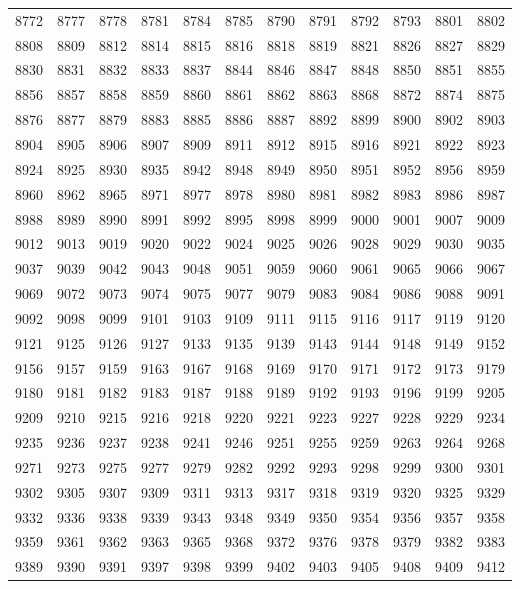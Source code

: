 \begin{center}
\begin{longtable}{llllllllllll}
8772 &8777 &8778 &8781 &8784 &8785 &8790 &8791 &8792 &8793 &8801 &8802 \\
8808 &8809 &8812 &8814 &8815 &8816 &8818 &8819 &8821 &8826 &8827 &8829 \\
8830 &8831 &8832 &8833 &8837 &8844 &8846 &8847 &8848 &8850 &8851 &8855 \\
8856 &8857 &8858 &8859 &8860 &8861 &8862 &8863 &8868 &8872 &8874 &8875 \\
8876 &8877 &8879 &8883 &8885 &8886 &8887 &8892 &8899 &8900 &8902 &8903 \\
8904 &8905 &8906 &8907 &8909 &8911 &8912 &8915 &8916 &8921 &8922 &8923 \\
8924 &8925 &8930 &8935 &8942 &8948 &8949 &8950 &8951 &8952 &8956 &8959 \\
8960 &8962 &8965 &8971 &8977 &8978 &8980 &8981 &8982 &8983 &8986 &8987 \\
8988 &8989 &8990 &8991 &8992 &8995 &8998 &8999 &9000 &9001 &9007 &9009 \\
9012 &9013 &9019 &9020 &9022 &9024 &9025 &9026 &9028 &9029 &9030 &9035 \\
9037 &9039 &9042 &9043 &9048 &9051 &9059 &9060 &9061 &9065 &9066 &9067 \\
9069 &9072 &9073 &9074 &9075 &9077 &9079 &9083 &9084 &9086 &9088 &9091 \\
9092 &9098 &9099 &9101 &9103 &9109 &9111 &9115 &9116 &9117 &9119 &9120 \\
9121 &9125 &9126 &9127 &9133 &9135 &9139 &9143 &9144 &9148 &9149 &9152 \\
9156 &9157 &9159 &9163 &9167 &9168 &9169 &9170 &9171 &9172 &9173 &9179 \\
9180 &9181 &9182 &9183 &9187 &9188 &9189 &9192 &9193 &9196 &9199 &9205 \\
9209 &9210 &9215 &9216 &9218 &9220 &9221 &9223 &9227 &9228 &9229 &9234 \\
9235 &9236 &9237 &9238 &9241 &9246 &9251 &9255 &9259 &9263 &9264 &9268 \\
9271 &9273 &9275 &9277 &9279 &9282 &9292 &9293 &9298 &9299 &9300 &9301 \\
9302 &9305 &9307 &9309 &9311 &9313 &9317 &9318 &9319 &9320 &9325 &9329 \\
9332 &9336 &9338 &9339 &9343 &9348 &9349 &9350 &9354 &9356 &9357 &9358 \\
9359 &9361 &9362 &9363 &9365 &9368 &9372 &9376 &9378 &9379 &9382 &9383 \\
9389 &9390 &9391 &9397 &9398 &9399 &9402 &9403 &9405 &9408 &9409 &9412 \\

\end{longtable}
\end{center}
